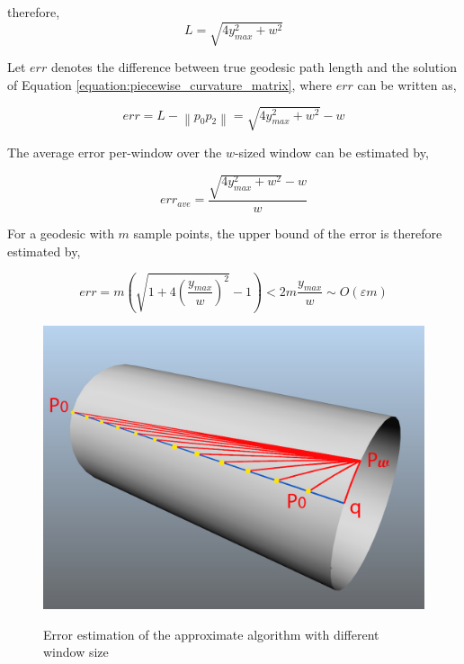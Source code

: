 therefore, 
\begin{equation}
L = \sqrt{4y^{2}_{max} + w^{2}}
\end{equation}

Let $err$ denotes the difference between true geodesic path length and the solution of Equation \ref{equation:piecewise_curvature_matrix}, where $err$ can be written as,

\begin{equation}
err = L - \left \| p_{0}p_{2} \right \|
= \sqrt{4y^{2}_{max} + w^{2}} - w
\end{equation}

The average error per-window over the $w$-sized window can be estimated by,

\begin{equation}
err_{ave} = \frac{\sqrt{4y^{2}_{max} + w^{2}} - w}{w}
\end{equation}

For a geodesic with $m$ sample points, the upper bound of the error is therefore estimated by,

\begin{equation}
err = m \left ( \sqrt{1 + 4(\frac{y_{max}}{w})^{2}}-1 \right ) < 2m\frac{y_{max}}{w} \sim O\left ( \varepsilon m \right )
\label{equation:geo_err}
\end{equation}

\begin{figure}[H]
	\centering
	\includegraphics[width=0.8\columnwidth]{../images/geodesic_image/cylinder_test}\\
    \caption{Error estimation of the approximate algorithm with different window size}
    \label{figure:geo_app_cylinder}
\end{figure}

